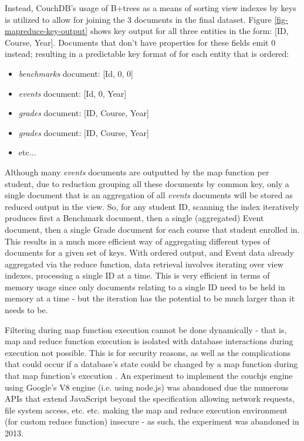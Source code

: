 Instead, CouchDB's usage of B+trees as a means of sorting view indexes by keys is utilized to allow for joining the 3 documents in the final dataset. Figure \ref{fig-mapreduce-key-output} shows key output for all three entities in the form: [ID, Course, Year]. Documents that don't have properties for these fields emit 0 instead; resulting in a predictable key format of for each entity that is ordered:

\begin{itemize}
    \item \textit{benchmarks} document: [Id, 0, 0]
    \item \textit{events} document: [Id, 0, Year]
    \item \textit{grades} document: [ID, Course, Year]
    \item \textit{grades} document: [ID, Course, Year]
    \item etc...
\end{itemize}

Although many \textit{events} documents are outputted by the map function per student, due to reduction grouping all these documents by common key, only a single document that is an aggregation of all \textit{events} documents will be stored as reduced output in the view. So, for any student ID, scanning the index iteratively produces first a Benchmark document, then a single (aggregated) Event document, then a single Grade document for each course that student enrolled in. This results in a much more efficient way of aggregating different types of documents for a given set of keys. With ordered output, and Event data already aggregated via the reduce function, data retrieval involves iterating over view indexes, processing a single ID at a time. This is very efficient in terms of memory usage since only documents relating to a single ID need to be held in memory at a time - but the iteration has the potential to be much larger than it needs to be.

Filtering during map function execution cannot be done dynamically - that is, map and reduce function execution is isolated with database interactions during execution not possible. This is for security reasons, as well as the complications that could occur if a database's state could be changed by a map function during that map function's execution \cite{slack28Feb}. An experiment to implement the couchjs engine using Google's V8 engine (i.e. using node.js) was abandoned due the numerous APIs that extend JavaScript beyond the specification allowing network requests, file system access, etc. etc. \cite{v8couchjs, slack28Feb} making the map and reduce execution environment (for custom reduce function) insecure - as such, the experiment was abandoned in 2013.

